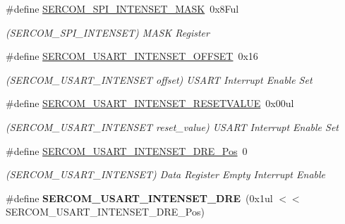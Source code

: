 \begin{DoxyCompactItemize}
\item 
\hypertarget{group___s_a_m_l21___s_e_r_c_o_m_ga13fd60e9da4dd6aaa940e9f22c7a8e94}{}\#define \hyperlink{group___s_a_m_l21___s_e_r_c_o_m_ga13fd60e9da4dd6aaa940e9f22c7a8e94}{S\+E\+R\+C\+O\+M\+\_\+\+S\+P\+I\+\_\+\+I\+N\+T\+E\+N\+S\+E\+T\+\_\+\+M\+A\+S\+K}~0x8\+Ful\label{group___s_a_m_l21___s_e_r_c_o_m_ga13fd60e9da4dd6aaa940e9f22c7a8e94}

\begin{DoxyCompactList}\small\item\em (S\+E\+R\+C\+O\+M\+\_\+\+S\+P\+I\+\_\+\+I\+N\+T\+E\+N\+S\+E\+T) M\+A\+S\+K Register \end{DoxyCompactList}\item 
\hypertarget{group___s_a_m_l21___s_e_r_c_o_m_ga944757514d38cdcead7f79509b898689}{}\#define \hyperlink{group___s_a_m_l21___s_e_r_c_o_m_ga944757514d38cdcead7f79509b898689}{S\+E\+R\+C\+O\+M\+\_\+\+U\+S\+A\+R\+T\+\_\+\+I\+N\+T\+E\+N\+S\+E\+T\+\_\+\+O\+F\+F\+S\+E\+T}~0x16\label{group___s_a_m_l21___s_e_r_c_o_m_ga944757514d38cdcead7f79509b898689}

\begin{DoxyCompactList}\small\item\em (S\+E\+R\+C\+O\+M\+\_\+\+U\+S\+A\+R\+T\+\_\+\+I\+N\+T\+E\+N\+S\+E\+T offset) U\+S\+A\+R\+T Interrupt Enable Set \end{DoxyCompactList}\item 
\hypertarget{group___s_a_m_l21___s_e_r_c_o_m_ga9f1c64f83d021c1cb2ed08acfd7a1039}{}\#define \hyperlink{group___s_a_m_l21___s_e_r_c_o_m_ga9f1c64f83d021c1cb2ed08acfd7a1039}{S\+E\+R\+C\+O\+M\+\_\+\+U\+S\+A\+R\+T\+\_\+\+I\+N\+T\+E\+N\+S\+E\+T\+\_\+\+R\+E\+S\+E\+T\+V\+A\+L\+U\+E}~0x00ul\label{group___s_a_m_l21___s_e_r_c_o_m_ga9f1c64f83d021c1cb2ed08acfd7a1039}

\begin{DoxyCompactList}\small\item\em (S\+E\+R\+C\+O\+M\+\_\+\+U\+S\+A\+R\+T\+\_\+\+I\+N\+T\+E\+N\+S\+E\+T reset\+\_\+value) U\+S\+A\+R\+T Interrupt Enable Set \end{DoxyCompactList}\item 
\hypertarget{group___s_a_m_l21___s_e_r_c_o_m_ga324e6c4ca006e33980271fe7f92c7622}{}\#define \hyperlink{group___s_a_m_l21___s_e_r_c_o_m_ga324e6c4ca006e33980271fe7f92c7622}{S\+E\+R\+C\+O\+M\+\_\+\+U\+S\+A\+R\+T\+\_\+\+I\+N\+T\+E\+N\+S\+E\+T\+\_\+\+D\+R\+E\+\_\+\+Pos}~0\label{group___s_a_m_l21___s_e_r_c_o_m_ga324e6c4ca006e33980271fe7f92c7622}

\begin{DoxyCompactList}\small\item\em (S\+E\+R\+C\+O\+M\+\_\+\+U\+S\+A\+R\+T\+\_\+\+I\+N\+T\+E\+N\+S\+E\+T) Data Register Empty Interrupt Enable \end{DoxyCompactList}\item 
\hypertarget{group___s_a_m_l21___s_e_r_c_o_m_ga4563746ecc9b199c9f504672968f912c}{}\#define {\bfseries S\+E\+R\+C\+O\+M\+\_\+\+U\+S\+A\+R\+T\+\_\+\+I\+N\+T\+E\+N\+S\+E\+T\+\_\+\+D\+R\+E}~(0x1ul $<$$<$ S\+E\+R\+C\+O\+M\+\_\+\+U\+S\+A\+R\+T\+\_\+\+I\+N\+T\+E\+N\+S\+E\+T\+\_\+\+D\+R\+E\+\_\+\+Pos)\label{group___s_a_m_l21___s_e_r_c_o_m_ga4563746ecc9b199c9f504672968f912c}


\end{DoxyCompactItemize}
